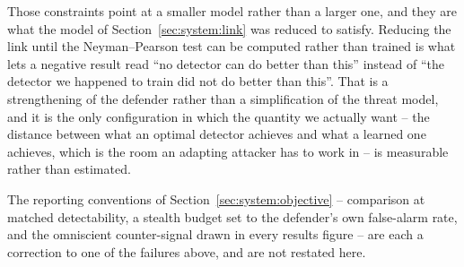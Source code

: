 Those constraints point at a smaller model rather than a larger one, and they are what the model of
Section~\ref{sec:system:link} was reduced to satisfy.
Reducing the link until the Neyman--Pearson test can be computed rather than trained is what lets a
negative result read ``no detector can do better than this'' instead of ``the detector we happened to
train did not do better than this''.
That is a strengthening of the defender rather than a simplification of the threat model, and it is
the only configuration in which the quantity we actually want -- the distance between what an optimal
detector achieves and what a learned one achieves, which is the room an adapting attacker has to work
in -- is measurable rather than estimated.

The reporting conventions of Section~\ref{sec:system:objective} -- comparison at matched
detectability, a stealth budget set to the defender's own false-alarm rate, and the omniscient
counter-signal drawn in every results figure -- are each a correction to one of the failures above,
and are not restated here.
